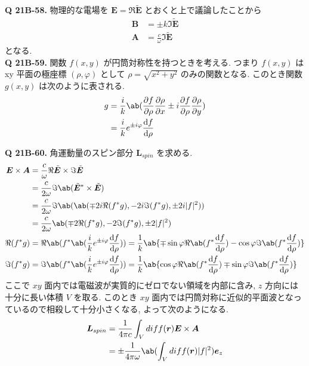 \documentclass[uplatex,dvipdfmx,a4paper,11pt]{jlreq}
\newcommand{\EE}{\bm{E}}
\newcommand{\BB}{\bm{B}}
\renewcommand{\AA}{\bm{A}}
\newcommand{\rr}{\bm{r}}
\newcommand{\ET}{\tilde{\bm{E}}}
\newcommand{\LL}{\bm{L}}
\theoremstyle{definition}
\begin{document}
\textbf{Q 21B-58.}
物理的な電場を $\EE = \Re\ET$ とおくと上で議論したことから
\begin{align}
  \BB & = \pm k\Im\ET \label{B tilde E} \\
  \AA & = \frac{c}{\omega}\Im\ET
\end{align}
となる. \\

\textbf{Q 21B-59.}
関数 $f(x,y)$ が円筒対称性を持つときを考える. つまり $f(x,y)$ は xy 平面の極座標 $(\rho, \varphi)$ として $\rho=\sqrt{x^2 + y^2}$ のみの関数となる. このとき関数 $g(x,y)$ は次のように表される.
\begin{align}
  g & = \frac{i}{k}\ab(\diffp{f}{\rho}\diffp{\rho}{x}\pm i\diffp{f}{\rho}\diffp{\rho}{y}) \\
    & = \frac{i}{k}e^{\pm i\varphi}\diff{f}{\rho} \label{def g}
\end{align}

\textbf{Q 21B-60.}
角運動量のスピン部分 $\LL_{spin}$ を求める.
\begin{align}
  \EE \times \AA & = \frac{c}{\omega}\Re\ET\times\Im\ET                                                                                                                           \\
                 & = \frac{c}{2\omega}\Im\ab(\ET^*\times\ET)                                                                                                                      \\
                 & = \frac{c}{2\omega}\Im\ab(\ab(\mp 2i\Re(f^*g), -2i\Im(f^*g), \pm 2i|f|^2))                                                                                     \\
                 & = \frac{c}{2\omega}\ab(\mp 2\Re(f^*g), -2\Im(f^*g), \pm 2|f|^2)                                                                                                \\
  \Re(f^*g)      & = \Re\ab(f^*\ab(\frac{i}{k}e^{\pm i\varphi}\diff{f}{\rho})) = \frac{1}{k}\ab\{\mp\sin\varphi\Re\ab(f^*\diff{f}{\rho}) - \cos\varphi\Im\ab(f^*\diff{f}{\rho})\} \\
  \Im(f^*g)      & = \Im\ab(f^*\ab(\frac{i}{k}e^{\pm i\varphi}\diff{f}{\rho})) = \frac{1}{k}\ab\{\cos\varphi\Re\ab(f^*\diff{f}{\rho}) \mp \sin\varphi\Im\ab(f^*\diff{f}{\rho})\}
\end{align}
ここで $xy$ 面内では電磁波が実質的にゼロでない領域を内部に含み, $z$ 方向には十分に長い体積 $V$ を取る. このとき $xy$ 面内では円筒対称に近似的平面波となっているので相殺して十分小さくなる, よって次のようになる.
\begin{align}
  \LL_{spin} & = \frac{1}{4\pi c}\int_V diff(\rr)\EE\times\AA              \\
             & = \pm\frac{1}{4\pi\omega}\ab(\int_V diff(\rr)|f|^2)\bm{e}_z
\end{align}
\end{document}
